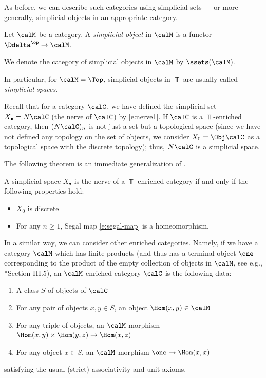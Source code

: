 As before, we can describe such categories using simplicial sets --- or more
generally, simplicial objects in an appropriate category.


\begin{definition}\label{d:simplicial-object}
  Let $\calM$ be a category. A \emph{simplicial object} in $\calM$
  is a functor $\Ddelta^\op\to \calM$.

  We denote the category of simplicial objects in $\calM$ by $\ssets(\calM)$.
\end{definition}
In particular, for $\calM=\Top$, simplicial objects in $\Top$
are usually called \emph{simplicial spaces}.

Recall that for a category $\calC$, we have defined the simplicial set
$X_\bullet = N\calC$ (the nerve of $\calC$) by \eqref{e:nerve1}. If $\calC$ is a
$\Top$-enriched category, then $(N\calC)_n$ is not just a set but a topological
space (since we have not defined any topology on the set of objects, we consider
$X_0=\Obj \calC$ as a topological space with the discrete topology); thus,
$N\calC$ is a simplicial space.


The following theorem is an immediate generalization of .
\begin{theorem}\label{t:nerve-characterization}
  A simplicial space $X_\bullet$ is the nerve of a $\Top$-enriched
  category if and only if the following properties hold:
  \begin{itemize}
    \item $X_0$ is discrete
    \item For any $n\ge 1$, Segal map \eqref{e:segal-map} is a homeomorphism.
  \end{itemize}
\end{theorem}





In a similar way, we can consider other enriched categories. Namely, if we have
a category $\calM$ which has finite products (and thus has a terminal object
$\one$ corresponding to the product of the empty collection of objects in $\calM$, see
e.g., *{Section III.5}), an $\calM$-enriched category
$\calC$ is the following data:

\begin{enumerate}
\item A class $S$ of objects of $\calC$
\item For any pair of objects $x,y\in S$, an object
  $\Hom(x,y)\in \calM$
\item For any triple of objects, an $\calM$-morphism
      $\Hom(x,y)\times \Hom(y,z)\to \Hom(x,z)$
\item For any object $x\in S$, an $\calM$-morphism $\one \to \Hom(x,x)$
\end{enumerate}
satisfying the usual (strict) associativity and unit axioms.


